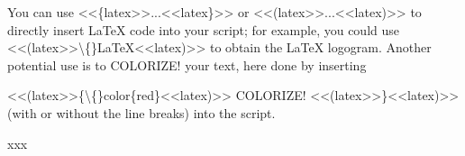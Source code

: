 
\begin{multicols}{2}
You can use {\mktsStyleCode{}<<\{latex>>...<<latex\}>>} or {\mktsStyleCode{}<<(latex>>...<<latex)>>} to directly insert LaTeX
code into your script; for example, you could
use {\mktsStyleCode{}<<(latex>>\textbackslash\{\}LaTeX<<latex)>>}
to obtain the \LaTeX{} logogram.
Another potential use is to {\color{red}{}COLORIZE!}{}
your text, here done by inserting\mktsShowpar\par
\begingroup\obeyalllines\mktsStyleCode{}<<(latex>>\{\textbackslash\{\}color\{red\}<<latex)>>
COLORIZE!
<<(latex>>\}<<latex)>>
\endgroup{}(with or without the line breaks) into the script.
\end{multicols}xxx\mktsShowpar\par

